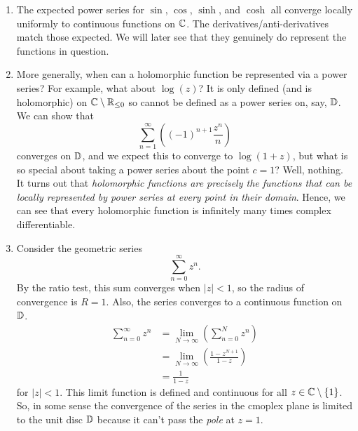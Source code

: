 \begin{example}
    \begin{enumerate}
        \item The expected power series for $\sin$, $\cos$, $\sinh$, and 
            $\cosh$ all converge locally uniformly to continuous functions on $\mathbb{C}$.
            The derivatives/anti-derivatives match those expected.
            We will later see that they genuinely do represent the functions in question.
        
        \item More generally, 
            when can a holomorphic function be represented via a power series? 
            For example, what about $\log(z)$? 
            It is only defined (and is holomorphic) on 
            $\mathbb{C} \setminus \mathbb{R}_{\leq 0}$ 
            so cannot be defined as a power series on, say, $\mathbb{D}$.
            We can show that
            \[ \sum_{n = 1}^\infty \left((-1)^{n + 1} \frac{z^n}n\right) \]
            converges on $\mathbb{D}$,
            and we expect this to converge to $\log{(1 + z)}$,
            but what is so special about taking a power series about the point $c = 1$?
            Well, nothing.
            It turns out that \emph{holomorphic functions are precisely the functions that can be locally represented by power series at every point in their domain}.
            Hence, we can see that every holomorphic function is infinitely many times complex differentiable.

        \item Consider the geometric series
            \[ \sum_{n = 0}^\infty z^n. \]
            By the ratio test, 
            this sum converges when $\lvert z \rvert < 1$, 
            so the radius of convergence is $R = 1$.
            Also, the series converges to a continuous function on $\mathbb{D}$.
            \begin{align*}
                \sum_{n = 0}^\infty z^n
                &= \lim_{N \to \infty} \left(\sum_{n = 0}^N z^n\right) \\
                &= \lim_{N \to \infty} \left(\frac{1 - z^{N + 1}}{1 - z}\right) \\
                &= \frac1{1 - z}
            \end{align*}
            for $\lvert z \rvert < 1$.
            This limit function is defined and continuous for all $z \in \mathbb{C} \setminus \{1\}$.
            So, in some sense the convergence of the series in the cmoplex plane is limited to the unit disc $\mathbb{D}$
            because it can't pass the \emph{pole} at $z = 1$.


\end{enumerate}
\end{example}

